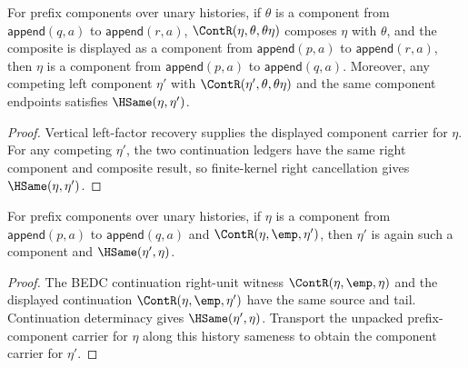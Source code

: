 \begin{theorem}
\label{thm:nattrans-prefix-component-carrier-vert-comp-left-factor-public-readback}
For prefix components over unary histories, if $\theta$ is a component from
$\mathsf{append}(q,a)$ to $\mathsf{append}(r,a)$,
$\ContR(\eta,\theta,\theta\eta)$ composes $\eta$ with $\theta$, and the
composite is displayed as a component from $\mathsf{append}(p,a)$ to
$\mathsf{append}(r,a)$, then $\eta$ is a component from
$\mathsf{append}(p,a)$ to $\mathsf{append}(q,a)$. Moreover, any competing left
component $\eta'$ with $\ContR(\eta',\theta,\theta\eta)$ and the same component
endpoints satisfies $\HSame(\eta,\eta')$.
\end{theorem}
\begin{proof}
Vertical left-factor recovery supplies the displayed component carrier for
$\eta$. For any competing $\eta'$, the two continuation ledgers have the same
right component and composite result, so finite-kernel right cancellation gives
$\HSame(\eta,\eta')$.
\end{proof}

\begin{theorem}
\label{thm:nattrans-prefix-component-vert-comp-right-identity-closed}
For prefix components over unary histories, if $\eta$ is a component from
$\mathsf{append}(p,a)$ to $\mathsf{append}(q,a)$ and
$\ContR(\eta,\emp,\eta')$, then $\eta'$ is again such a component and
$\HSame(\eta',\eta)$.
\end{theorem}
\begin{proof}
The BEDC continuation right-unit witness $\ContR(\eta,\emp,\eta)$ and the
displayed continuation $\ContR(\eta,\emp,\eta')$ have the same source and
tail. Continuation determinacy gives $\HSame(\eta',\eta)$. Transport the
unpacked prefix-component carrier for $\eta$ along this history sameness to
obtain the component carrier for $\eta'$.
\end{proof}


